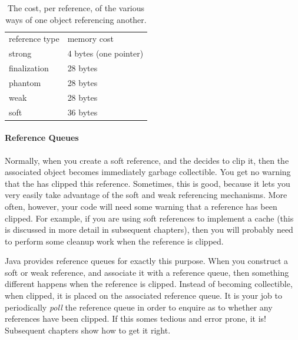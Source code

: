 \begin{table}
\centering
	\begin{tabular}{ll}
		\toprule
		reference type & memory cost \\
        \cmidrule(r){1-1} \cmidrule(l){2-2}		
		strong         & 4 bytes (one pointer) \\
		finalization   & 28 bytes \\
        phantom        & 28 bytes \\ 
		weak           & 28 bytes \\
		soft           & 36 bytes \\
		\bottomrule
	\end{tabular}
	\caption{The cost, per reference, of the various ways of one object
	referencing another.}
	\label{tab:reference-costs}
\end{table}


\paragraph{Reference Queues}
Normally, when you create a soft reference, and the \jre decides to clip it,
then the associated  object becomes immediately garbage
collectible. You get no warning that the \jre has clipped this reference.
Sometimes, this is good, because it lets you very easily take advantage of the
soft and weak referencing mechanisms. More often, however, your code will need
some warning that a reference has been clipped. For example, if you are using
soft references to implement a cache (this is discussed in more detail in
subsequent chapters), then you will probably need to perform some cleanup work
when the reference is clipped.

Java provides reference queues for exactly this purpose. When you construct a
soft or weak reference, and associate it with a reference queue, then something
different happens when the reference is clipped. Instead of becoming
collectible, when clipped, it is placed on the associated reference queue. It is
your job to periodically \emph{poll} the reference queue in order to enquire as
to whether any references have been clipped. If this somes tedious and error
prone, it is! Subsequent chapters show how to get it right.

